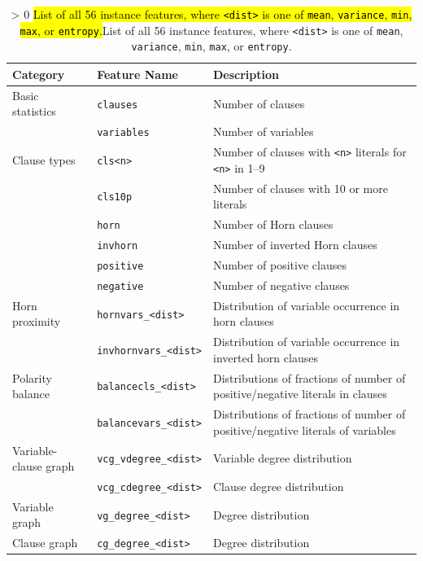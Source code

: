 \documentclass[sn-basic, Numbered]{sn-jnl} %
\newcommand{\showchanges}{1} %
\newcommand{\change}[1]{\ifnum \showchanges > 0 \sethlcolor{yellow}\hl{#1}\else#1\fi}
\begin{document}
\begin{table}[h]
    \centering
    \caption{
      \change{List of all 56 instance features, where \texttt{<dist>} is one of \texttt{mean}, \texttt{variance}, \texttt{min}, \texttt{max}, or \texttt{entropy}.}
    }
    \label{tab:features}
    \begin{tabular}{
      >{\arraybackslash}p{}
      >{\arraybackslash}p{}
      >{\arraybackslash}p{}
    }
      \toprule
      Category & Feature Name & Description \\
      \midrule
      Basic statistics & \verb|clauses| & Number of clauses \\
      & \verb|variables| & Number of variables \\
      \midrule
      Clause types & \verb|cls<n>| & Number of clauses with \verb|<n>| literals for \verb|<n>| in 1--9 \\
      & \verb|cls10p| & Number of clauses with 10 or more literals \\
      & \verb|horn| & Number of Horn clauses \\
      & \verb|invhorn| & Number of inverted Horn clauses \\
      & \verb|positive| & Number of positive clauses \\
      & \verb|negative| & Number of negative clauses \\
      \midrule
      Horn proximity & \verb|hornvars_<dist>| & Distribution of variable occurrence in horn clauses \\
      & \verb|invhornvars_<dist>| & Distribution of variable occurrence in inverted horn clauses \\
      \midrule
      Polarity balance & \verb|balancecls_<dist>| & Distributions of fractions of number of positive/negative literals in clauses \\
      & \verb|balancevars_<dist>| & Distributions of fractions of number of positive/negative literals of variables \\
      \midrule
      Variable-clause graph & \verb|vcg_vdegree_<dist>| & Variable degree distribution \\
      & \verb|vcg_cdegree_<dist>| & Clause degree distribution \\
      \midrule
      Variable graph & \verb|vg_degree_<dist>| & Degree distribution \\
      \midrule
      Clause graph & \verb|cg_degree_<dist>| & Degree distribution \\
      \bottomrule
    \end{tabular}
\end{table}
\end{document}
